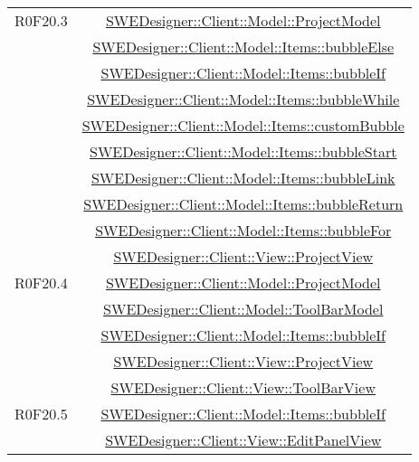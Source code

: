 \documentclass[../DefinizioneDiProdotto.tex]{subfiles}
\begin{document}
\begin{longtable}{|c|c|}
				R0F20.3
				& \hyperlink{SWEDesigner::Client::Model::ProjectModel}{SWEDesigner::Client::Model::ProjectModel}\\
				& \hyperlink{SWEDesigner::Client::Model::Items::bubbleElse}{SWEDesigner::Client::Model::Items::bubbleElse}\\
				& \hyperlink{SWEDesigner::Client::Model::Items::bubbleIf}{SWEDesigner::Client::Model::Items::bubbleIf}\\
				& \hyperlink{SWEDesigner::Client::Model::Items::bubbleWhile}{SWEDesigner::Client::Model::Items::bubbleWhile}\\
				& \hyperlink{SWEDesigner::Client::Model::Items::customBubble}{SWEDesigner::Client::Model::Items::customBubble}\\
				& \hyperlink{SWEDesigner::Client::Model::Items::bubbleStart}{SWEDesigner::Client::Model::Items::bubbleStart}\\
				& \hyperlink{SWEDesigner::Client::Model::Items::bubbleLink}{SWEDesigner::Client::Model::Items::bubbleLink}\\
				& \hyperlink{SWEDesigner::Client::Model::Items::bubbleReturn}{SWEDesigner::Client::Model::Items::bubbleReturn}\\
				& \hyperlink{SWEDesigner::Client::Model::Items::bubbleFor}{SWEDesigner::Client::Model::Items::bubbleFor}\\
				& \hyperlink{SWEDesigner::Client::View::ProjectView}{SWEDesigner::Client::View::ProjectView}\\
				\hline

				R0F20.4
				& \hyperlink{SWEDesigner::Client::Model::ProjectModel}{SWEDesigner::Client::Model::ProjectModel}\\
				& \hyperlink{SWEDesigner::Client::Model::ToolBarModel}{SWEDesigner::Client::Model::ToolBarModel}\\
				& \hyperlink{SWEDesigner::Client::Model::Items::bubbleIf}{SWEDesigner::Client::Model::Items::bubbleIf}\\
				& \hyperlink{SWEDesigner::Client::View::ProjectView}{SWEDesigner::Client::View::ProjectView}\\
				& \hyperlink{SWEDesigner::Client::View::ToolBarView}{SWEDesigner::Client::View::ToolBarView}\\
				\hline

				R0F20.5
				& \hyperlink{SWEDesigner::Client::Model::Items::bubbleIf}{SWEDesigner::Client::Model::Items::bubbleIf}\\
				& \hyperlink{SWEDesigner::Client::View::EditPanelView}{SWEDesigner::Client::View::EditPanelView}\\
				\hline


\end{longtable}
\end{document}
